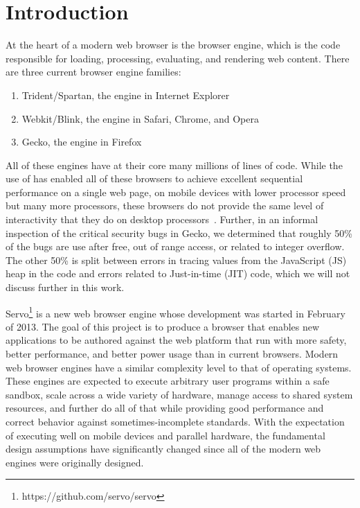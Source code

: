 
\section{Introduction}
\label{sec:intro}
At the heart of a modern web browser is the browser engine, which is the code responsible
for loading, processing, evaluating, and rendering web content.
There are three current browser engine families:
\begin{enumerate}
\item Trident/Spartan, the engine in Internet Explorer
\item Webkit/Blink, the engine in Safari, Chrome, and Opera
\item Gecko, the engine in Firefox
\end{enumerate}
All of these engines have at their core many millions of lines of \Cplusplus code.
While the use of \Cplusplus has enabled all of these browsers to achieve excellent sequential
performance on a single web page, on mobile devices with lower processor speed but many
more processors, these browsers do not provide the same level of interactivity that they
do on desktop processors~\cite{parallelizing-web-pages,ZOOMM}.
Further, in an informal inspection of the critical security bugs in Gecko, we determined that
roughly 50\% of the bugs are use after free, out of range access, or related to integer
overflow.
The other 50\% is split between errors in tracing values from the JavaScript (JS) heap in the
\Cplusplus code and errors related to Just-in-time (JIT) code, which we will not discuss
further in this work.

Servo\footnote{https://github.com/servo/servo} is a new web browser engine whose development
was started in February of 2013.
The goal of this project is to produce a browser that enables new applications to be authored
against the web platform that run with more safety, better performance, and better power usage
than in current browsers.
Modern web browser engines have a similar complexity level to that of operating systems.
These engines are expected to execute arbitrary user programs within a safe sandbox, scale 
across a wide variety of hardware, manage access to shared system resources, and further 
do all of that while providing good performance and correct behavior
against sometimes-incomplete standards.
With the expectation of executing well on mobile devices and parallel hardware, the 
fundamental design assumptions have significantly changed since all of the modern
web engines were originally designed.


